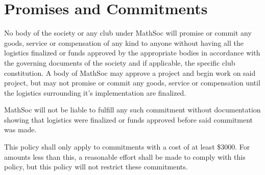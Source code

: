 \section{Promises and Commitments}
No body of the society or any club under MathSoc will promise or commit any goods, service or compensation of any kind to anyone without having all the logistics finalized or funds approved by the appropriate bodies in accordance with the governing documents of the society and if applicable, the specific club constitution. 
A body of MathSoc may approve a project and begin work on said project, but may not promise or commit any goods, service or compensation until the logistics surrounding it's implementation are finalized. 

MathSoc will not be liable to fulfill any such commitment without documentation showing that logistics were finalized or funds approved before said commitment was made.

This policy shall only apply to commitments with a cost of at least \$3000. For amounts less than this, a reasonable effort shall be made to comply with this policy, but this policy will not restrict these commitments.
